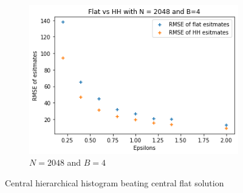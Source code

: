 \documentclass[11pt]{article}
\theoremstyle{definition}
\begin{document}
\begin{figure}[H]
\begin{subfigure}{.3\textwidth}
  \includegraphics[width=\linewidth]{figures/central_hh_flat/hh_beat_flat=2048_B=4.png}
  \caption{$N=2048$ and $B=4$}
  \label{fig:cen2048}
\end{subfigure}
\caption{Central hierarchical histogram beating central flat solution}
\label{fig:cen_hh_flat}
\end{figure}
\end{document}
